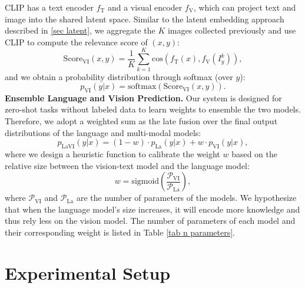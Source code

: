 \documentclass[11pt]{article}
\begin{document}
CLIP has a text encoder $f_{\mathrm{T}}$ and a visual encoder $f_{\mathrm{V}}$, which can project text and image into the shared latent space. Similar to the latent embedding approach described in \ref{sec latent}, we aggregate the $K$ images collected previously and use CLIP to compute the relevance score of $(x, y)$:
\begin{equation} \label{eq VI score}
    \text{Score}_{\text{VI}}(x, y) = \frac{1}{K} \sum_{k=1}^K \text{cos} (f_{\mathrm{T}} (x), f_{\mathrm{V}}(I_y^{k})),
\end{equation}
and we obtain a probability distribution through softmax (over $y$):
\begin{equation}
    p_{\text{VI}}(y | x) = \text{softmax}\left(\text{Score}_{\text{VI}}(x, y)\right).
\end{equation}
\medbreak
\noindent\textbf{Ensemble Language and Vision Prediction.} Our system is designed for zero-shot tasks without labeled data to learn weights to ensemble the two models. Therefore, we adopt a weighted sum as the late fusion over the final output distributions of the language and multi-modal models:
\begin{equation} \label{eq ensemble}
    p_{\text{LaVI}}(y|x) = (1 - w) \cdot p_{\text{La}}(y|x) + w \cdot p_{\text{VI}}(y|x),
\end{equation}
where we design a heuristic function to calibrate the weight $w$ based on the relative size between the vision-text model and the language model:
\begin{equation} \label{eq: ensemble weight}
    w = \text{sigmoid}\left(\frac{\mathcal{P}_{\text{VI}}}{\mathcal{P}_{\text{La}}}\right),
\end{equation}
where $\mathcal{P}_{\text{VI}}$ and $\mathcal{P}_{\text{La}}$ are the number of parameters of the models. We hypothesize that when the language model's size increases, it will encode more knowledge and thus rely less on the vision model. The number of parameters of each model and their corresponding weight is listed in Table \ref{tab n parameters}.

\section{Experimental Setup}
\end{document}
